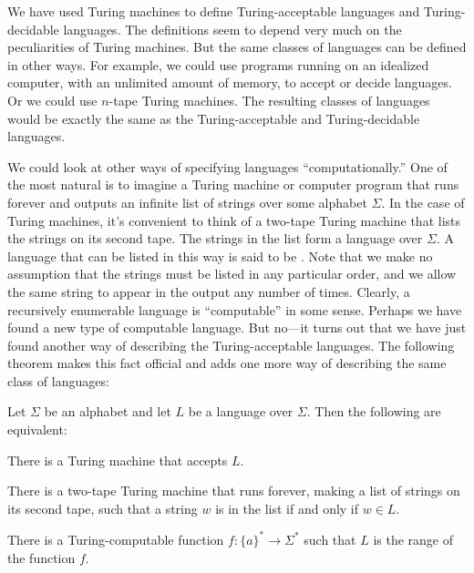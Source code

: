\medbreak

We have used Turing machines to define Turing-acceptable languages
and Turing-decidable languages.  The definitions seem to depend
very much on the peculiarities of Turing machines.  But the same
classes of languages can be defined in other ways.  For example,
we could use programs running on an idealized computer, with an
unlimited amount of memory, to accept or decide languages.  Or we
could use $n$-tape Turing machines.  The
resulting classes of languages would be exactly the same as the
Turing-acceptable and Turing-decidable languages.

We could look at other ways of specifying languages ``computationally.''
One of the most natural is to imagine a Turing machine or computer
program that runs forever and outputs an infinite list of strings
over some alphabet $\Sigma$.  In the case of Turing machines, it's
convenient to think of a two-tape Turing machine that lists the strings
on its second tape.  The strings in the list form a language
over $\Sigma$.  A language that can be listed in this way is
said to be . 
Note that we make no
assumption that the strings must be listed in any particular order,
and we allow the same string to appear in the output any number of
times.  Clearly, a recursively enumerable language is ``computable''
in some sense.  Perhaps we have found a new type of computable language.
But no---it turns out that we have just found another way of
describing the Turing-acceptable languages.  The following theorem
makes this fact official and adds one more way of describing
the same class of languages:

\begin{theorem}
Let $\Sigma$ be an alphabet and let $L$ be a language over $\Sigma$.
Then the following are equivalent:

\smallskip
{}There is a Turing machine that accepts $L$.

\smallskip
{}There is a two-tape Turing machine that runs forever, making 
a list of strings on its second tape, such that a string $w$ is in 
the list if and only if $w\in L$.

\smallskip
{}There is a Turing-computable function $f\colon\{a\}^*\to\Sigma^*$
such that $L$ is the range of the function $f$.
\end{theorem}

